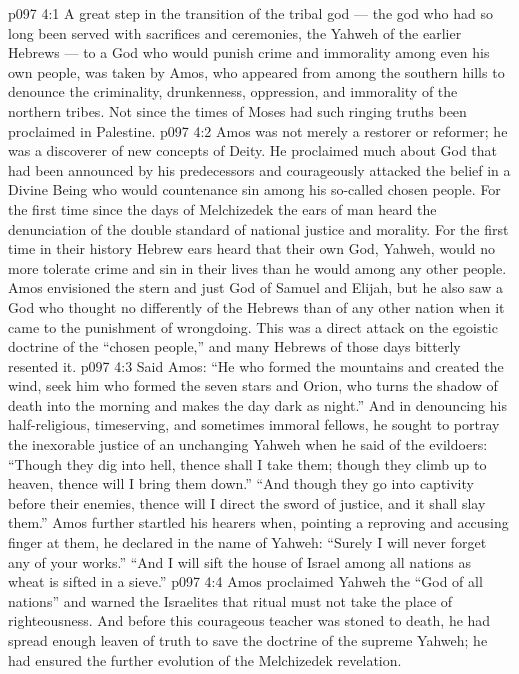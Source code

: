 \vs p097 4:1 A great step in the transition of the tribal god --- the god who had so long been served with sacrifices and ceremonies, the Yahweh of the earlier Hebrews --- to a God who would punish crime and immorality among even his own people, was taken by Amos, who appeared from among the southern hills to denounce the criminality, drunkenness, oppression, and immorality of the northern tribes. Not since the times of Moses had such ringing truths been proclaimed in Palestine.
\vs p097 4:2 Amos was not merely a restorer or reformer; he was a discoverer of new concepts of Deity. He proclaimed much about God that had been announced by his predecessors and courageously attacked the belief in a Divine Being who would countenance sin among his so\hyp{}called chosen people. For the first time since the days of Melchizedek the ears of man heard the denunciation of the double standard of national justice and morality. For the first time in their history Hebrew ears heard that their own God, Yahweh, would no more tolerate crime and sin in their lives than he would among any other people. Amos envisioned the stern and just God of Samuel and Elijah, but he also saw a God who thought no differently of the Hebrews than of any other nation when it came to the punishment of wrongdoing. This was a direct attack on the egoistic doctrine of the “chosen people,” and many Hebrews of those days bitterly resented it.
\vs p097 4:3 Said Amos: “He who formed the mountains and created the wind, seek him who formed the seven stars and Orion, who turns the shadow of death into the morning and makes the day dark as night.” And in denouncing his half\hyp{}religious, timeserving, and sometimes immoral fellows, he sought to portray the inexorable justice of an unchanging Yahweh when he said of the evildoers: “Though they dig into hell, thence shall I take them; though they climb up to heaven, thence will I bring them down.” “And though they go into captivity before their enemies, thence will I direct the sword of justice, and it shall slay them.” Amos further startled his hearers when, pointing a reproving and accusing finger at them, he declared in the name of Yahweh: “Surely I will never forget any of your works.” “And I will sift the house of Israel among all nations as wheat is sifted in a sieve.”
\vs p097 4:4 Amos proclaimed Yahweh the “God of all nations” and warned the Israelites that ritual must not take the place of righteousness. And before this courageous teacher was stoned to death, he had spread enough leaven of truth to save the doctrine of the supreme Yahweh; he had ensured the further evolution of the Melchizedek revelation.
